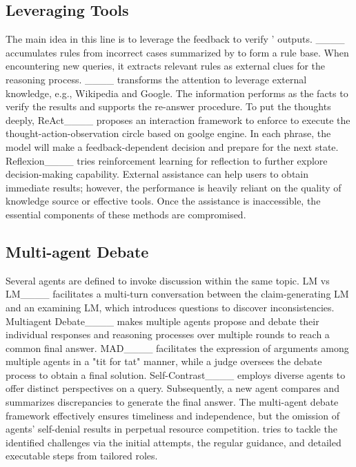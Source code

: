 \subsection{Leveraging Tools}
The main idea in this line is to leverage the feedback to verify \llm' outputs.
\tran____ accumulates rules from incorrect cases summarized by \llm to form a rule base. When encountering new queries, it extracts relevant rules as external clues for the reasoning process. 
\ve____ transforms the attention to leverage external knowledge, e.g., Wikipedia and Google. The information performs as the facts to verify the results and supports the re-answer procedure.
To put the thoughts deeply, {ReAct}____ proposes an interaction framework to enforce \llm to execute the thought-action-observation circle based on goolge engine. In each phrase, the model will make a feedback-dependent decision and prepare for the next state.
{Reflexion}____ tries reinforcement learning for reflection to further explore decision-making capability.
External assistance can help users to obtain immediate results; however, the performance is heavily reliant on the quality of knowledge source or effective tools. 
Once the assistance is inaccessible, the essential components of these methods are compromised.

\subsection{Multi-agent Debate}
Several agents are defined to invoke discussion within the same topic.
LM vs LM____ facilitates a multi-turn conversation between the claim-generating LM and an examining LM, which introduces questions to discover inconsistencies.
Multiagent Debate____ makes multiple agents propose and debate their individual responses and reasoning processes over multiple rounds to reach a common final answer.
MAD____ facilitates the expression of arguments among multiple agents in a "tit for tat" manner, while a judge oversees the debate process to obtain a final solution.
Self-Contrast____ employs diverse agents     to offer distinct perspectives on a query. Subsequently, a new agent compares and summarizes discrepancies to generate the final answer. 
The multi-agent debate framework effectively ensures timeliness and independence, but the omission of agents' self-denial results in perpetual resource competition.
\ours tries to tackle the identified challenges via the initial attempts, the regular guidance, and detailed executable steps from tailored roles.